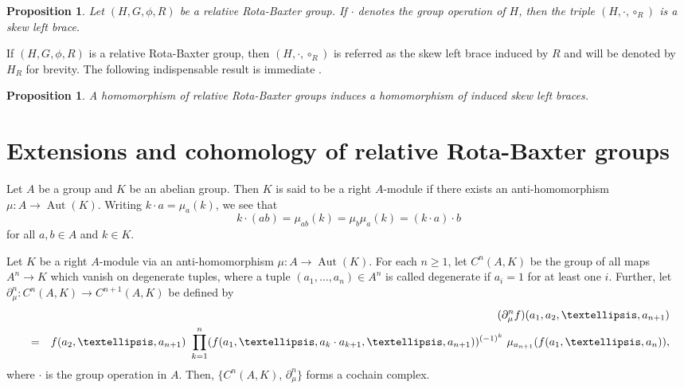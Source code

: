 \documentclass[11pt]{amsart}
\theoremstyle{thrm}
\theoremstyle{plain}
\newtheorem{prop}[thm]{Proposition}
\theoremstyle{definition}
\newcommand{\Aut}{\operatorname{Aut} }
\numberwithin{equation}{section}
\begin{document}
\begin{prop}\label{rrb2sb}\cite[Proposition 3.5]{NM1} 
	Let $(H, G, \phi, R)$ be a relative Rota-Baxter group. If $\cdot$ denotes the  group operation of $H$, then the triple $(H, \cdot, \circ_R)$ is a skew left brace. 
\end{prop}

If $(H, G, \phi, R)$ is a relative Rota-Baxter group, then $(H, \cdot, \circ_R)$ is referred as the skew left brace induced by $R$ and will be denoted by $H_R$ for brevity. The following indispensable result is immediate \cite[Proposition 4.3]{NM1}.

\begin{prop}\label{rrb to slb homo}
A homomorphism of relative Rota-Baxter groups induces a homomorphism of induced skew left braces. 
\end{prop}
\medskip


\section{Extensions and cohomology of relative Rota-Baxter groups}\label{sec cohomology and extensions of RRB groups}

Let $A$ be a group and $K$ be an abelian group.  Then $K$ is said to be a right $A$-module if there exists an anti-homomorphism $\mu: A \rightarrow \Aut(K)$. Writing $k \cdot a= \mu_a(k)$, we see that 
$$k \cdot (ab)= \mu_{ab}(k)=  \mu_{b} \mu_{a}(k)= (k \cdot a) \cdot b$$ 
for all $a, b \in A$ and $k \in K$.

Let $K$ be a right $A$-module via an anti-homomorphism $\mu: A \to \Aut(K)$. For each $n \geq 1$, let $C^n(A, K)$ be the group of all maps $A^n \to K$ which vanish on degenerate tuples, where a tuple $(a_1,\ldots, a_n) \in A^n$ is called degenerate if $a_i = 1$ for at least one $i$. Further, let $\partial_\mu^n: C^n(A,K) \rightarrow C^{n+1}(A,K)$ be defined by
\begin{eqnarray}\label{group coboundary mu}
&& (\partial_\mu^n f)(a_1, a_2,\ldots, a_{n+1}) \\
&= & f(a_2, \ldots,a_{n+1})~ \prod^{n}_{k=1}    (f(a_1, \ldots, a_k \cdot a_{k+1}, \ldots, a_{n+1}))^{(-1)^k}~ \mu_{a_{n+1}}(f(a_1, \ldots,a_{n})), \notag
\end{eqnarray} 
where $\cdot$ is the group operation in $A$. Then, $\{C^n(A, K)$, $\partial_\mu^n\}$ forms a cochain complex. 
\par 
\end{document}
